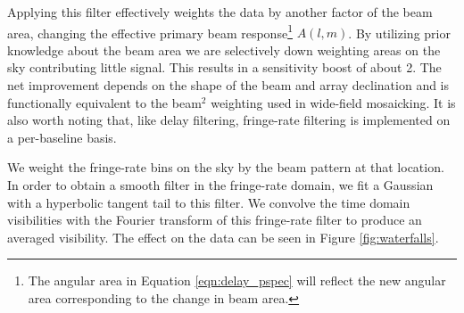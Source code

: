 \documentclass[twocolumn,numberedappendix]{emulateapj} \shorttitle{PSA64}
\begin{document}
Applying this filter effectively weights the data by another factor of the beam
area, changing the effective primary beam response\footnote{The
angular area in Equation \eqref{eqn:delay_pspec} will reflect the new angular area
corresponding to the change in beam area.} $A(l,m)$\citep{parsons_et_al2015}. By
utilizing prior knowledge about the beam area we are selectively down weighting
areas on the sky contributing little signal. This results in a sensitivity boost of
about 2.  The net improvement depends on the shape of the beam and array
declination and is functionally equivalent to the beam$^2$ weighting used in
wide-field mosaicking. It is also worth noting that, like delay 
filtering, fringe-rate filtering is implemented on a per-baseline basis.

 We weight
the fringe-rate bins on the sky by the beam pattern at that location.
In order to obtain a smooth filter in the fringe-rate domain, we fit a
Gaussian with a hyperbolic tangent tail to this filter. We convolve the time
domain visibilities with the Fourier transform of this fringe-rate filter to
produce an averaged visibility.  The effect on the data can be seen
in Figure \ref{fig:waterfalls}.

\end{document}
